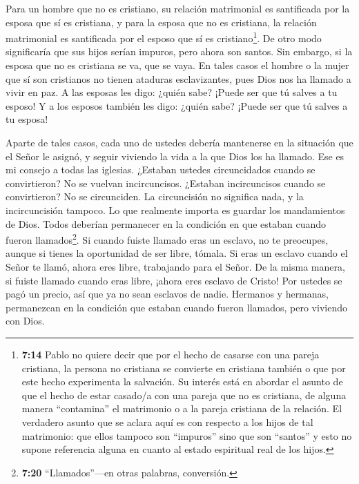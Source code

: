  Para un hombre que no es cristiano, su relación
matrimonial es santificada por la esposa que sí es cristiana, y para la
esposa que no es cristiana, la relación matrimonial es santificada por
el esposo que sí es cristiano\footnote{\textbf{7:14} Pablo no quiere
  decir que por el hecho de casarse con una pareja cristiana, la persona
  no cristiana se convierte en cristiana también o que por este hecho
  experimenta la salvación. Su interés está en abordar el asunto de que
  el hecho de estar casado/a con una pareja que no es cristiana, de
  alguna manera ``contamina'' el matrimonio o a la pareja cristiana de
  la relación. El verdadero asunto que se aclara aquí es con respecto a
  los hijos de tal matrimonio: que ellos tampoco son ``impuros'' sino
  que son ``santos'' y esto no supone referencia alguna en cuanto al
  estado espiritual real de los hijos.}. De otro modo significaría que
sus hijos serían impuros, pero ahora son santos.  Sin
embargo, si la esposa que no es cristiana se va, que se vaya. En tales
casos el hombre o la mujer que sí son cristianos no tienen ataduras
esclavizantes, pues Dios nos ha llamado a vivir en paz.  A
las esposas les digo: ¿quién sabe? ¡Puede ser que tú salves a tu esposo!
Y a los esposos también les digo: ¿quién sabe? ¡Puede ser que tú salves
a tu esposa!

 Aparte de tales casos, cada uno de ustedes debería
mantenerse en la situación que el Señor le asignó, y seguir viviendo la
vida a la que Dios los ha llamado. Ese es mi consejo a todas las
iglesias.  ¿Estaban ustedes circuncidados cuando se
convirtieron? No se vuelvan incircuncisos. ¿Estaban incircuncisos cuando
se convirtieron? No se circunciden.  La circuncisión no
significa nada, y la incircuncisión tampoco. Lo que realmente importa es
guardar los mandamientos de Dios.  Todos deberían
permanecer en la condición en que estaban cuando fueron
llamados\footnote{\textbf{7:20} ``Llamados''---en otras palabras,
  conversión.}.  Si cuando fuiste llamado eras un esclavo,
no te preocupes, aunque si tienes la oportunidad de ser libre, tómala.
 Si eras un esclavo cuando el Señor te llamó, ahora eres
libre, trabajando para el Señor. De la misma manera, si fuiste llamado
cuando eras libre, ¡ahora eres esclavo de Cristo!  Por
ustedes se pagó un precio, así que ya no sean esclavos de nadie.
 Hermanos y hermanas, permanezcan en la condición que
estaban cuando fueron llamados, pero viviendo con Dios.

